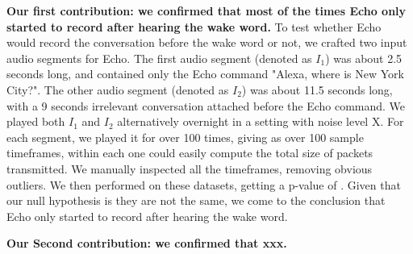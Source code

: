 \textbf{Our first contribution: we confirmed that most of the times Echo only started to record after hearing the wake word.} To test whether Echo would record the conversation before the wake word or not, we crafted two input audio segments for Echo. The first audio segment (denoted as $I_1$) was about 2.5 seconds long, and contained only the Echo command "Alexa, where is New York City?". The other audio segment (denoted as $I_2$) was about 11.5 seconds long, with a 9 seconds irrelevant conversation attached before the Echo command. We played both $I_1$ and $I_2$ alternatively overnight in a setting with noise level X. For each segment, we played it for over 100 times, giving as over 100 sample timeframes, within each one could easily compute the total size of packets transmitted. We manually inspected all the timeframes, removing obvious outliers. We then performed  on these datasets, getting a p-value of . Given that our null hypothesis is they are not the same, we come to the conclusion that Echo only started to record after hearing the wake word.

\textbf{Our Second contribution: we confirmed that xxx.} 



